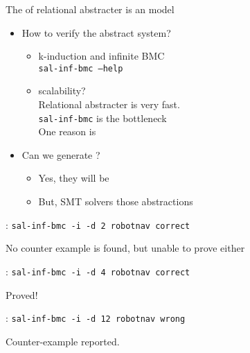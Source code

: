 \documentclass{seminar}
\begin{document}
\begin{slide}

The {} of relational abstracter is an 
{} model

\begin{itemize}
\item How to verify the abstract system?
 \begin{itemize}
  \item k-induction and infinite BMC
  \\
   {\tt{sal-inf-bmc --help}}
  \item scalability?
  \\
   Relational abstracter is very fast.
  \\
   {\tt{sal-inf-bmc}} is the bottleneck
  \\
   One reason is {}
 \end{itemize}

\item Can we generate {}?
 \begin{itemize}
  \item Yes, they will be {}
  \item But, {} SMT solvers {} those abstractions
 \end{itemize}
 
\end{itemize}

\end{slide}
\begin{slide}

{}: {\tt{sal-inf-bmc -i -d 2 robotnav correct}}

No counter example is found, but unable to prove either

\bigskip

{}: {\tt{sal-inf-bmc -i -d 4 robotnav correct}}

Proved!

\bigskip

{}: {\tt{sal-inf-bmc -i -d 12 robotnav wrong}}

Counter-example reported.


\end{slide}
\end{document}

